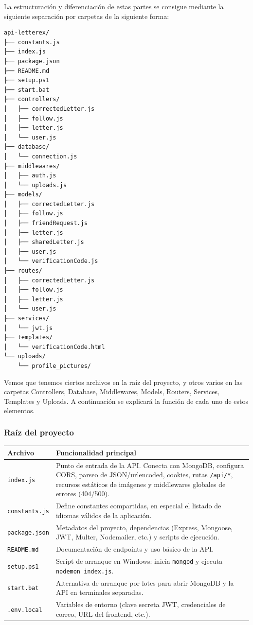 La estructuración y diferenciación de estas partes se consigue mediante la siguiente separación por carpetas de la siguiente forma:


\begin{verbatim}
api-letterex/
├── constants.js
├── index.js
├── package.json
├── README.md
├── setup.ps1
├── start.bat
├── controllers/
│   ├── correctedLetter.js
│   ├── follow.js
│   ├── letter.js
│   └── user.js
├── database/
│   └── connection.js
├── middlewares/
│   ├── auth.js
│   └── uploads.js
├── models/
│   ├── correctedLetter.js
│   ├── follow.js
│   ├── friendRequest.js
│   ├── letter.js
│   ├── sharedLetter.js
│   ├── user.js
│   └── verificationCode.js
├── routes/
│   ├── correctedLetter.js
│   ├── follow.js
│   ├── letter.js
│   └── user.js
├── services/
│   └── jwt.js
├── templates/
│   └── verificationCode.html
└── uploads/
    └── profile_pictures/
\end{verbatim}


Vemos que tenemos ciertos archivos en la raíz del proyecto, y otros varios en las carpetas Controllers, Database, Middlewares, Models, Routers, Services, Templates y Uploads. A continuación se explicará la función de cada uno de estos elementos.

\subsubsection{Raíz del proyecto}

\begin{longtable}{|p{3.8cm}|p{10.3cm}|}
\hline
\textbf{Archivo} & \textbf{Funcionalidad principal} \\
\hline
\texttt{index.js} & Punto de entrada de la API. Conecta con MongoDB, configura CORS, parseo de JSON/urlencoded, cookies, rutas \texttt{/api/*}, recursos estáticos de imágenes y middlewares globales de errores (404/500). \\
\hline
\texttt{constants.js} & Define constantes compartidas, en especial el listado de idiomas válidos de la aplicación. \\
\hline
\texttt{package.json} & Metadatos del proyecto, dependencias (Express, Mongoose, JWT, Multer, Nodemailer, etc.) y scripts de ejecución. \\
\hline
\texttt{README.md} & Documentación de endpoints y uso básico de la API. \\
\hline
\texttt{setup.ps1} & Script de arranque en Windows: inicia \texttt{mongod} y ejecuta \texttt{nodemon index.js}. \\
\hline
\texttt{start.bat} & Alternativa de arranque por lotes para abrir MongoDB y la API en terminales separadas. \\
\hline
\texttt{.env.local} & Variables de entorno (clave secreta JWT, credenciales de correo, URL del frontend, etc.). \\
\hline
\end{longtable}

